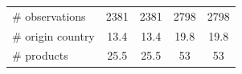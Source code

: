 \documentclass[10 pt,Helvetica, french]{beamer}
\begin{document}
\begin{frame}[label = robustness1]
\begin{itemize}
\begin{table}[htbp]
{\begin{center}
\begin{tabular}{lcc|cc}
\# observations & 2381 & 2381 & 2798 & 2798 \\
\# origin country & 13.4 & 13.4 & 19.8 & 19.8 \\
\# products & 25.5 & 25.5 & 53 & 53 \\ \hline \hline
    \end{tabular}%
\end{center}}
\end{table}
   \end{itemize}

\end{frame}

\end{document}
